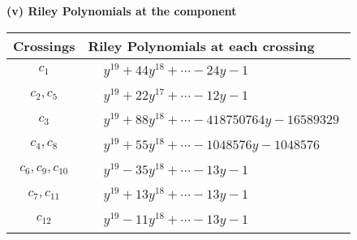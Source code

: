 \documentclass[1p]{elsarticle_modified}
\theoremstyle{definition}
\begin{document}
\flushleft \textbf{(v) Riley Polynomials at the component}\newline \\
\begin{tabular}{m{50pt}|m{274pt}}
Crossings & \hspace{64pt}Riley Polynomials at each crossing \\
\hline $$\begin{aligned}c_{1}\end{aligned}$$&$\begin{aligned}
&y^{19}+44 y^{18}+\cdots-24 y-1
\end{aligned}$\\
\hline $$\begin{aligned}c_{2},c_{5}\end{aligned}$$&$\begin{aligned}
&y^{19}+22 y^{17}+\cdots-12 y-1
\end{aligned}$\\
\hline $$\begin{aligned}c_{3}\end{aligned}$$&$\begin{aligned}
&y^{19}+88 y^{18}+\cdots-418750764 y-16589329
\end{aligned}$\\
\hline $$\begin{aligned}c_{4},c_{8}\end{aligned}$$&$\begin{aligned}
&y^{19}+55 y^{18}+\cdots-1048576 y-1048576
\end{aligned}$\\
\hline $$\begin{aligned}c_{6},c_{9},c_{10}\end{aligned}$$&$\begin{aligned}
&y^{19}-35 y^{18}+\cdots-13 y-1
\end{aligned}$\\
\hline $$\begin{aligned}c_{7},c_{11}\end{aligned}$$&$\begin{aligned}
&y^{19}+13 y^{18}+\cdots-13 y-1
\end{aligned}$\\
\hline $$\begin{aligned}c_{12}\end{aligned}$$&$\begin{aligned}
&y^{19}-11 y^{18}+\cdots-13 y-1
\end{aligned}$\\
\hline
\end{tabular}\\~\\
\end{document}

